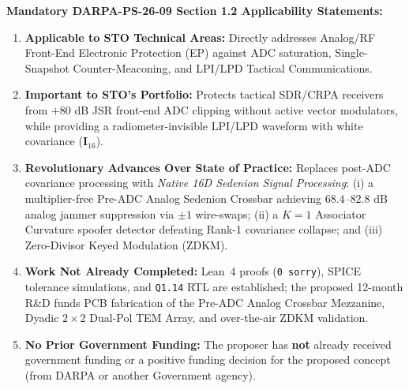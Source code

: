 \documentclass[12pt,letterpaper]{article}
\begin{document}
\vspace{1pt}
\textbf{Mandatory DARPA-PS-26-09 Section 1.2 Applicability Statements:}
\begin{enumerate}[leftmargin=16pt,itemsep=-1pt,topsep=0pt]
    \item \textbf{Applicable to STO Technical Areas:} Directly addresses Analog/RF Front-End Electronic Protection (EP) against ADC saturation, Single-Snapshot Counter-Meaconing, and LPI/LPD Tactical Communications.
    \item \textbf{Important to STO's Portfolio:} Protects tactical SDR/CRPA receivers from $+80\text{ dB}$ JSR front-end ADC clipping without active vector modulators, while providing a radiometer-invisible LPI/LPD waveform with white covariance ($\mathbf{I}_{16}$).
    \item \textbf{Revolutionary Advances Over State of Practice:} Replaces post-ADC covariance processing with \textit{Native 16D Sedenion Signal Processing}: (i) a multiplier-free Pre-ADC Analog Sedenion Crossbar achieving $68.4\text{--}82.8\text{ dB}$ analog jammer suppression via $\pm 1$ wire-swaps; (ii) a $K=1$ Associator Curvature spoofer detector defeating Rank-1 covariance collapse; and (iii) Zero-Divisor Keyed Modulation (ZDKM).
    \item \textbf{Work Not Already Completed:} Lean~4 proofs (\texttt{0 sorry}), SPICE tolerance simulations, and \texttt{Q1.14} RTL are established; the proposed 12-month R\&D funds PCB fabrication of the Pre-ADC Analog Crossbar Mezzanine, Dyadic $2\times 2$ Dual-Pol TEM Array, and over-the-air ZDKM validation.
    \item \textbf{No Prior Government Funding:} The proposer has \textbf{not} already received government funding or a positive funding decision for the proposed concept (from DARPA or another Government agency).
\end{enumerate}

\newpage
\setcounter{page}{1}
\end{document}
